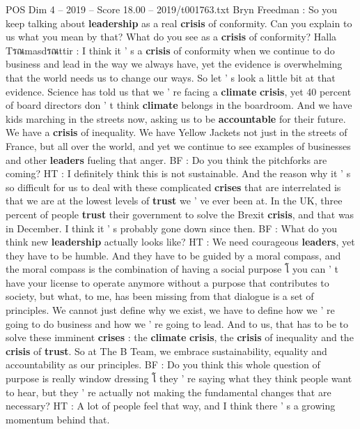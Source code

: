 \begin{textsample}{POS Dim 4 – 2019 – Score 18.00 – 2019/t001763.txt}  \label{ex:f4_pos_049}
Bryn Freedman : So you keep talking about \textbf{leadership} as a real \textbf{crisis} of conformity.
Can you explain to us what you mean by that?
What do you see as a \textbf{crisis} of conformity?
Halla Tรณmasdรณttir : I think it ' s a \textbf{crisis} of conformity when we continue to do business and lead in the way we always have, yet the evidence is overwhelming that the world needs us to change our ways.
So let ' s look a little bit at that evidence.
Science has told us that we ' re facing a \textbf{climate} \textbf{crisis}, yet 40 percent of board directors don ' t think \textbf{climate} belongs in the boardroom.
And we have kids marching in the streets now, asking us to be \textbf{accountable} for their future.
We have a \textbf{crisis} of inequality.
We have Yellow Jackets not just in the streets of France, but all over the world, and yet we continue to see examples of businesses and other \textbf{leaders} fueling that anger.
BF : Do you think the pitchforks are coming?
HT : I definitely think this is not sustainable.
And the reason why it ' s so difficult for us to deal with these complicated \textbf{crises} that are interrelated is that we are at the lowest levels of \textbf{trust} we ' ve ever been at.
In the UK, three percent of people \textbf{trust} their government to solve the Brexit \textbf{crisis}, and that was in December.
I think it ' s probably gone down since then.
BF : What do you think new \textbf{leadership} actually looks like?
HT : We need courageous \textbf{leaders}, yet they have to be humble.
And they have to be guided by a moral compass, and the moral compass is the combination of having a social purpose โ you can ' t have your license to operate anymore without a purpose that contributes to society, but what, to me, has been missing from that dialogue is a set of principles.
We cannot just define why we exist, we have to define how we ' re going to do business and how we ' re going to lead.
And to us, that has to be to solve these imminent \textbf{crises} : the \textbf{climate} \textbf{crisis}, the \textbf{crisis} of inequality and the \textbf{crisis} of \textbf{trust}.
So at The B Team, we embrace sustainability, equality and accountability as our principles.
BF : Do you think this whole question of purpose is really window dressing โ they ' re saying what they think people want to hear, but they ' re actually not making the fundamental changes that are necessary?
HT : A lot of people feel that way, and I think there ' s a growing momentum behind that.

\end{textsample}
